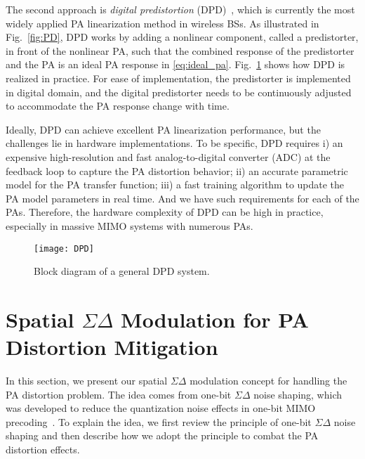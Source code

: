 \documentclass[10pt,twocolumn,twoside]{IEEEtran}
\def\blue{\color{blue}}
\begin{document}
The second approach is {\it digital predistortion} (DPD)~\cite{ghannouchi2009behavioral,guan2014green,katz2016evolution},
which is currently the most widely applied PA linearization method in wireless BSs.
As illustrated in Fig.~\ref{fig:PD},
DPD works by adding
a nonlinear component, called a predistorter, in front of the nonlinear PA, such that the combined response
of the predistorter and the PA
is an ideal PA response in \eqref{eq:ideal_pa}.
Fig.~\ref{fig:DPD} shows how DPD is realized in practice.
For ease of implementation, the predistorter is implemented in digital domain, and the digital predistorter needs to be continuously adjusted to accommodate the PA response change with time.


Ideally, DPD can achieve excellent PA linearization performance,
but the challenges lie in hardware implementations.
To be specific, DPD requires
i) an expensive high-resolution and fast analog-to-digital converter (ADC) at the feedback loop to capture the PA distortion behavior;
ii) an accurate parametric model for the PA transfer function;
iii) a fast training algorithm to update the PA model parameters in real time.
And we have such requirements for each of the PAs.
Therefore, the hardware complexity of DPD can be high in practice, especially in massive MIMO systems with numerous PAs.

\begin{figure}%
	\centering
	\texttt{[image: DPD]}
	\caption{Block diagram of a general DPD system.}
	\label{fig:DPD}
\end{figure}



\section{Spatial $\Sigma \Delta$ Modulation for PA Distortion Mitigation}
\label{sec:sd_all}

In this section, we present our spatial $\Sigma \Delta$ modulation concept for handling the PA distortion problem.
The idea comes from one-bit $\Sigma \Delta$ noise shaping, which was developed to reduce the quantization noise effects in one-bit MIMO precoding~\cite{shao2019one}.
To explain the idea, we first review the principle of one-bit $\Sigma \Delta$ noise shaping and then describe how we adopt the principle to combat the PA distortion effects.
\end{document}
